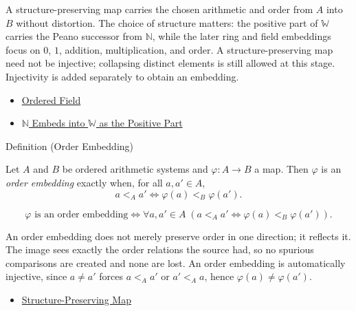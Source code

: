 \begin{remark*}[Interpretation]
A structure-preserving map carries the chosen arithmetic and order from $A$
into $B$ without distortion. The choice of structure matters: the positive
part of $\mathbb{W}$ carries the Peano successor from $\mathbb{N}$, while
the later ring and field embeddings focus on $0$, $1$, addition,
multiplication, and order. A structure-preserving map need not be injective;
collapsing distinct elements is still allowed at this stage. Injectivity is
added separately to obtain an embedding.
\end{remark*}
\begin{dependencies}
\begin{itemize}
  \item \hyperref[def:abstract-ordered-field]{Ordered Field}
  \item \hyperref[thm:n-embeds-into-w-as-positive-part]{$\mathbb{N}$ Embeds into $\mathbb{W}$ as the Positive Part}
\end{itemize}
\end{dependencies}
\begin{definitionbox}{Definition (Order Embedding)}
\begin{definition}
\label{def:order-embedding}
Let $A$ and $B$ be ordered arithmetic systems and $\varphi:A\to B$ a map. Then $\varphi$ is an \emph{order embedding} exactly when, for all $a,a'\in A$,
\[
a<_A a' \Longleftrightarrow \varphi(a)<_B\varphi(a').
\]
\end{definition}
\end{definitionbox}
\begin{remark*}
\[
\varphi \text{ is an order embedding} \Longleftrightarrow \forall a,a'\in A\;(a<_A a' \Longleftrightarrow \varphi(a)<_B\varphi(a')).
\]
\end{remark*}
\begin{remark*}[Interpretation]
An order embedding does not merely preserve order in one direction; it reflects it. The image sees exactly the order relations the source had, so no spurious comparisons are created and none are lost. An order embedding is automatically injective, since $a\neq a'$ forces $a<_A a'$ or $a'<_A a$, hence $\varphi(a)\neq\varphi(a')$.
\end{remark*}
\begin{dependencies}
\begin{itemize}
  \item \hyperref[def:structure-preserving-map]{Structure-Preserving Map}
\end{itemize}
\end{dependencies}
